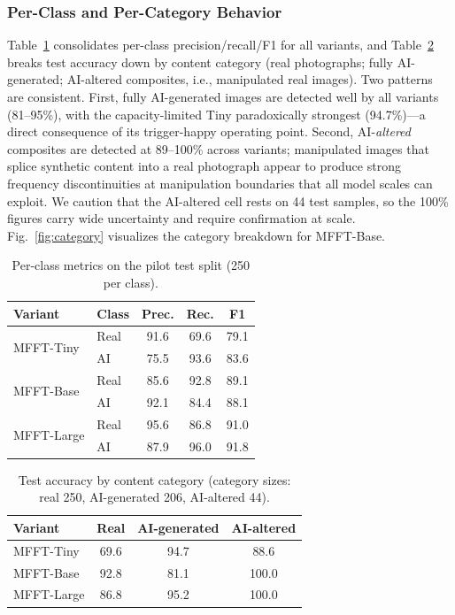 \documentclass[journal]{IEEEtran}
\begin{document}
\subsubsection{Per-Class and Per-Category Behavior}
Table~\ref{tab:perclass} consolidates per-class precision/recall/F1 for all variants, and Table~\ref{tab:percat} breaks test accuracy down by content category (real photographs; fully AI-generated; AI-altered composites, i.e., manipulated real images). Two patterns are consistent. First, fully AI-generated images are detected well by all variants (81--95\%), with the capacity-limited Tiny paradoxically strongest (94.7\%)---a direct consequence of its trigger-happy operating point. Second, AI-\emph{altered} composites are detected at 89--100\% across variants; manipulated images that splice synthetic content into a real photograph appear to produce strong frequency discontinuities at manipulation boundaries that all model scales can exploit. We caution that the AI-altered cell rests on 44 test samples, so the 100\% figures carry wide uncertainty and require confirmation at scale. Fig.~\ref{fig:category} visualizes the category breakdown for MFFT-Base.

\begin{table}[!t]
\renewcommand{\arraystretch}{1.2}
\caption{Per-class metrics on the pilot test split (250 per class).}
\label{tab:perclass}
\centering
\setlength{\tabcolsep}{4pt}
\begin{tabular}{llccc}
\toprule
Variant & Class & Prec. & Rec. & F1 \\
\midrule
\multirow{2}{*}{MFFT-Tiny}  & Real & 91.6 & 69.6 & 79.1 \\
                            & AI   & 75.5 & 93.6 & 83.6 \\
\midrule
\multirow{2}{*}{MFFT-Base}  & Real & 85.6 & 92.8 & 89.1 \\
                            & AI   & 92.1 & 84.4 & 88.1 \\
\midrule
\multirow{2}{*}{MFFT-Large} & Real & 95.6 & 86.8 & 91.0 \\
                            & AI   & 87.9 & 96.0 & 91.8 \\
\bottomrule
\end{tabular}
\end{table}

\begin{table}[!t]
\renewcommand{\arraystretch}{1.2}
\caption{Test accuracy by content category (category sizes: real 250, AI-generated 206, AI-altered 44).}
\label{tab:percat}
\centering
\setlength{\tabcolsep}{4pt}
\begin{tabular}{lccc}
\toprule
Variant & Real & AI-generated & AI-altered \\
\midrule
MFFT-Tiny  & 69.6 & 94.7 & 88.6 \\
MFFT-Base  & 92.8 & 81.1 & 100.0 \\
MFFT-Large & 86.8 & 95.2 & 100.0 \\
\bottomrule
\end{tabular}
\end{table}
\end{document}
